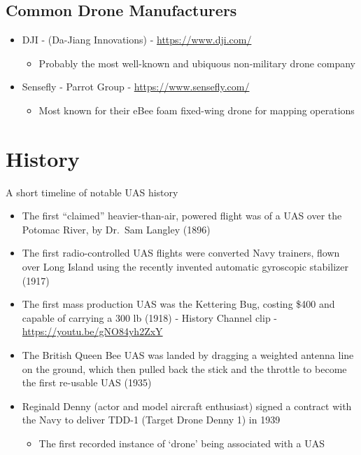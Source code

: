 \documentclass[
]{book}
\providecommand{\tightlist}{%
  \setlength{\itemsep}{0pt}\setlength{\parskip}{0pt}}
\theoremstyle{definition}
\theoremstyle{definition}
\theoremstyle{definition}
\theoremstyle{remark}
\begin{document}
\hypertarget{common-drone-manufacturers}{%
\subsection{Common Drone Manufacturers}\label{common-drone-manufacturers}}

\begin{itemize}
\tightlist
\item
  DJI - (Da-Jiang Innovations) - \url{https://www.dji.com/}

  \begin{itemize}
  \tightlist
  \item
    Probably the most well-known and ubiquous non-military drone company
  \end{itemize}
\item
  Sensefly - Parrot Group - \url{https://www.sensefly.com/}

  \begin{itemize}
  \tightlist
  \item
    Most known for their eBee foam fixed-wing drone for mapping operations
  \end{itemize}
\end{itemize}

\hypertarget{history}{%
\section{History}\label{history}}

A short timeline of notable UAS history

\begin{itemize}
\tightlist
\item
  The first ``claimed'' heavier-than-air, powered flight was of a UAS over the Potomac River, by Dr.~Sam Langley (1896)
\item
  The first radio-controlled UAS flights were converted Navy trainers, flown over Long Island using the recently invented automatic gyroscopic stabilizer (1917)
\item
  The first mass production UAS was the Kettering Bug, costing \$400 and capable of carrying a 300 lb (1918) - History Channel clip - \url{https://youtu.be/gNO84yh2ZxY}
\item
  The British Queen Bee UAS was landed by dragging a weighted antenna line on the ground, which then pulled back the stick and the throttle to become the first re-usable UAS (1935)
\item
  Reginald Denny (actor and model aircraft enthusiast) signed a contract with the Navy to deliver TDD-1 (Target Drone Denny 1) in 1939

  \begin{itemize}
  \tightlist
  \item
    The first recorded instance of `drone' being associated with a UAS
  \end{itemize}
\end{itemize}
\end{document}
